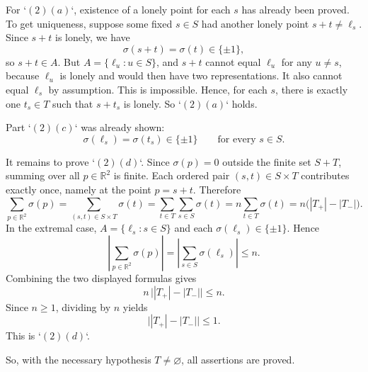 For `$(2)(a)$`, existence of a lonely point for each $s$ has already been proved. To get uniqueness, suppose some fixed $s\in S$ had another lonely point $s+t\neq \ell_s$. Since $s+t$ is lonely, we have
\[
\sigma(s+t)=\sigma(t)\in\{\pm1\},
\]
so $s+t\in A$. But $A=\{\ell_u:u\in S\}$, and $s+t$ cannot equal $\ell_u$ for any $u\neq s$, because $\ell_u$ is lonely and would then have two representations. It also cannot equal $\ell_s$ by assumption. This is impossible. Hence, for each $s$, there is exactly one $t_s\in T$ such that $s+t_s$ is lonely. So `$(2)(a)$` holds.

Part `$(2)(c)$` was already shown:
\[
\sigma(\ell_s)=\sigma(t_s)\in\{\pm1\}\qquad\text{for every }s\in S.
\]

It remains to prove `$(2)(d)$`. Since $\sigma(p)=0$ outside the finite set $S+T$, summing over all $p\in\mathbb R^2$ is finite. Each ordered pair $(s,t)\in S\times T$ contributes exactly once, namely at the point $p=s+t$. Therefore
\[
\sum_{p\in\mathbb R^2}\sigma(p)
=
\sum_{(s,t)\in S\times T}\sigma(t)
=
\sum_{t\in T}\sum_{s\in S}\sigma(t)
=
n\sum_{t\in T}\sigma(t)
=
n\bigl(|T_+|-|T_-|\bigr).
\]
In the extremal case, $A=\{\ell_s:s\in S\}$ and each $\sigma(\ell_s)\in\{\pm1\}$. Hence
\[
\left|\sum_{p\in\mathbb R^2}\sigma(p)\right|
=
\left|\sum_{s\in S}\sigma(\ell_s)\right|
\le n.
\]
Combining the two displayed formulas gives
\[
n\,\bigl||T_+|-|T_-|\bigr|
\le n.
\]
Since $n\ge 1$, dividing by $n$ yields
\[
\bigl||T_+|-|T_-|\bigr|\le 1.
\]
This is `$(2)(d)$`.

So, with the necessary hypothesis $T\neq\varnothing$, all assertions are proved.